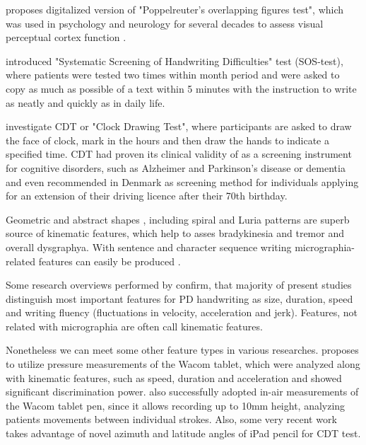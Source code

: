 \citet{nomm2016recognition} proposes digitalized version of "Poppelreuter's overlapping figures test", which was used in psychology and neurology for several decades to assess visual perceptual cortex function \cite{sala1995poppelreuter}.

\citet{nackaerts2017validity} introduced "Systematic Screening of Handwriting Difficulties" test (SOS-test), where patients were tested two times within month period and were asked to copy as much as possible of a text within 5 minutes with the instruction to write as neatly and quickly as in daily life.

\citet{korner2012simple, souillard2016learning, brodaty1997clock} investigate CDT or "Clock Drawing Test", where participants are asked to draw the face of clock, mark in the hours and then draw the hands to indicate a specified time. CDT had proven its clinical validity of as a screening instrument for cognitive disorders, such as Alzheimer and Parkinson's disease or dementia and even recommended in Denmark \cite{korner2012simple} as screening method for individuals applying for an extension of their driving licence after their 70th birthday.

Geometric and abstract shapes \cite{nomm2016recognition}, including spiral \cite{san2016digitized} and Luria patterns \cite{nomm2016quantitative} are superb source of kinematic features, which help to asses bradykinesia and tremor and overall dysgraphya. With sentence and character sequence writing micrographia-related features can easily be produced \cite{smits2014standardized, nackaerts2017validity}. 

% 
% 

Some research overviews performed by \citet{pinto2015handwriting, letanneux2014micrographia} confirm, that majority of present studies distinguish most important features for PD handwriting as size, duration, speed and writing fluency (fluctuations in velocity, acceleration and jerk). Features, not related with micrographia are often call kinematic features.

Nonetheless we can meet some other feature types in various researches. \citet{drotar2016evaluation} proposes to utilize pressure measurements of the Wacom tablet, which were analyzed along with kinematic features, such as speed, duration and acceleration and showed significant discrimination power. \citet{drotar2013new} also successfully adopted in-air measurements of the Wacom tablet pen, since it allows recording up to 10mm height, analyzing patients movements between individual strokes. Also, some very recent work \cite{masarov2017clock} takes advantage of novel azimuth and latitude angles of iPad pencil for CDT test.


